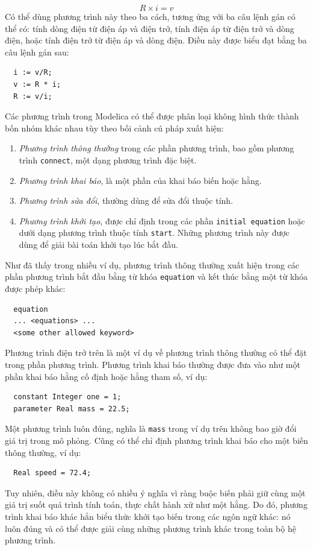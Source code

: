 \begin{equation}R\times i=v\tag{3.10}\end{equation}
Có thể dùng phương trình này theo ba cách, tương ứng với ba câu lệnh gán có thể có: tính dòng điện từ điện áp và điện trở, tính điện áp từ điện trở và dòng điện, hoặc tính điện trở từ điện áp và dòng điện. Điều này được biểu đạt bằng ba câu lệnh gán sau:
\begin{verbatim}
  i := v/R;
  v := R * i;
  R := v/i;
\end{verbatim}
Các phương trình trong Modelica có thể được phân loại không hình thức thành bốn nhóm khác nhau tùy theo bối cảnh cú pháp xuất hiện:
\begin{enumerate}
\item \emph{Phương trình thông thường} trong các phần phương trình, bao gồm phương trình \texttt{connect}, một dạng phương trình đặc biệt.
\item \emph{Phương trình khai báo}, là một phần của khai báo biến hoặc hằng.
\item \emph{Phương trình sửa đổi}, thường dùng để sửa đổi thuộc tính.
\item \emph{Phương trình khởi tạo}, được chỉ định trong các phần \texttt{initial equation} hoặc dưới dạng phương trình thuộc tính \texttt{start}. Những phương trình này được dùng để giải bài toán khởi tạo lúc bắt đầu.
\end{enumerate}
Như đã thấy trong nhiều ví dụ, phương trình thông thường xuất hiện trong các phần phương trình bắt đầu bằng từ khóa \texttt{equation} và kết thúc bằng một từ khóa được phép khác:
\begin{verbatim}
  equation
  ... <equations> ...
  <some other allowed keyword>
\end{verbatim}
Phương trình điện trở trên là một ví dụ về phương trình thông thường có thể đặt trong phần phương trình. Phương trình khai báo thường được đưa vào như một phần khai báo hằng cố định hoặc hằng tham số, ví dụ:
\begin{verbatim}
  constant Integer one = 1;
  parameter Real mass = 22.5;
\end{verbatim}
Một phương trình luôn đúng, nghĩa là \texttt{mass} trong ví dụ trên không bao giờ đổi giá trị trong mô phỏng. Cũng có thể chỉ định phương trình khai báo cho một biến thông thường, ví dụ:
\begin{verbatim}
  Real speed = 72.4;
\end{verbatim}
Tuy nhiên, điều này không có nhiều ý nghĩa vì ràng buộc biến phải giữ cùng một giá trị suốt quá trình tính toán, thực chất hành xử như một hằng. Do đó, phương trình khai báo khác hẳn biểu thức khởi tạo biến trong các ngôn ngữ khác: nó luôn đúng và có thể được giải cùng những phương trình khác trong toàn bộ hệ phương trình.

